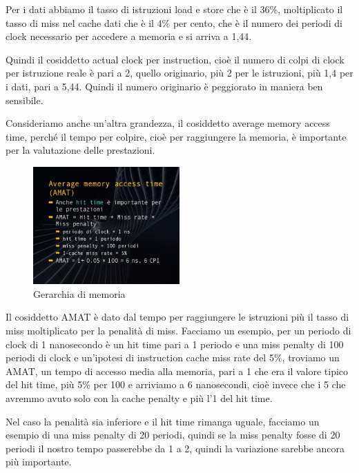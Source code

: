 Per i dati abbiamo il tasso di istruzioni load e store che è il 36\%, moltiplicato il tasso di miss nel cache dati che è il 4\% per cento, che è il numero dei periodi di clock necessario per accedere a memoria e si arriva a 1,44.

Quindi il cosiddetto actual clock per instruction, cioè il numero di colpi di clock per istruzione reale è pari a 2, quello originario, più 2 per le istruzioni, più 1,4 per i dati, pari a 5,44. Quindi il numero originario è peggiorato in maniera ben sensibile.

Consideriamo anche un'altra grandezza, il cosiddetto average memory access time, perché il tempo per colpire, cioè per raggiungere la memoria, è importante per la valutazione delle prestazioni.

\FloatBarrier
\begin{figure}[H]
  \centering
  \includegraphics[width=0.50\textwidth,
                    trim=20 40 10 40, %
                    clip]
                    {images/Lez06_p04_fig_04.png}
  \caption{Gerarchia di memoria}
  \label{fig:Lez06_p04_fig_04}
\end{figure}
\FloatBarrier
\noindent

Il cosiddetto AMAT è dato dal tempo per raggiungere le istruzioni più il tasso di miss moltiplicato per la penalità di miss.
Facciamo un esempio, per un periodo di clock di 1 nanosecondo è un hit time pari a 1 periodo e una miss penalty di 100 periodi di clock e un'ipotesi di instruction cache miss rate del 5\%, troviamo un AMAT, un tempo di accesso media alla memoria, pari a 1 che era il valore tipico del hit time, più 5\% per 100 e arriviamo a 6 nanosecondi, cioè invece che i 5 che avremmo avuto solo con la cache penalty e più l'1 del hit time.

Nel caso la penalità sia inferiore e il hit time rimanga uguale, facciamo un esempio di una miss penalty di 20 periodi, quindi se la miss penalty fosse di 20 periodi il nostro tempo passerebbe da 1 a 2, quindi la variazione sarebbe ancora più importante.

